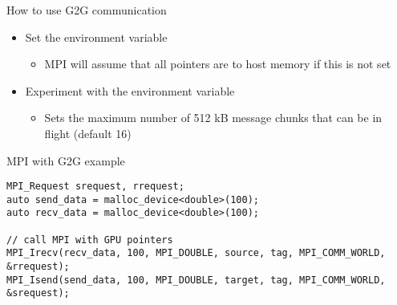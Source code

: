 \documentclass[aspectratio=43]{beamer}
\begin{document}
\begin{frame}[fragile]{How to use G2G communication}
    \begin{itemize}
        \item Set the environment variable 
        \begin{itemize}
            \item MPI will assume that all pointers are to host memory if this is not set
        \end{itemize}
        \item Experiment with the environment variable 
        \begin{itemize}
            \item Sets the maximum number of 512 kB message chunks that can be in flight (default 16)
        \end{itemize}
    \end{itemize}

   \begin{code}{MPI with G2G example}
        \begin{lstlisting}[style=boxcudatiny]
MPI_Request srequest, rrequest;
auto send_data = malloc_device<double>(100);
auto recv_data = malloc_device<double>(100);

// call MPI with GPU pointers
MPI_Irecv(recv_data, 100, MPI_DOUBLE, source, tag, MPI_COMM_WORLD, &rrequest);
MPI_Isend(send_data, 100, MPI_DOUBLE, target, tag, MPI_COMM_WORLD, &srequest);
        \end{lstlisting}
   \end{code}

\end{frame}
\end{document}
